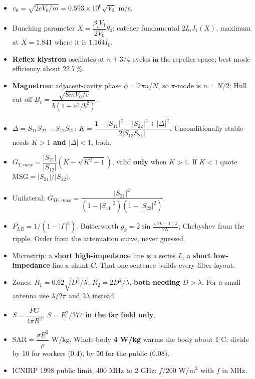 \begin{itemize}
  \item $v_0 = \sqrt{2eV_0/m} = 0.593\times10^6\sqrt{V_0}$ m/s.
  \item Bunching parameter $X = \dfrac{\beta_i V_1}{2V_0}\theta_0$; catcher fundamental
    $2I_0J_1(X)$, maximum at $X = \mathbf{1.841}$ where it is $1.164I_0$.
  \item \textbf{Reflex klystron} oscillates at $n + 3/4$ cycles in the repeller space;
    best mode efficiency about 22.7\,\%.
  \item \textbf{Magnetron}: adjacent-cavity phase $\phi = 2\pi n/N$, so $\pi$-mode is
    $n = N/2$; Hull cut-off $B_c = \dfrac{\sqrt{8mV_0/e}}{b(1-a^2/b^2)}$.
\end{itemize}

\begin{itemize}
  \item $\Delta = S_{11}S_{22} - S_{12}S_{21}$;
    $K = \dfrac{1-|S_{11}|^2-|S_{22}|^2+|\Delta|^2}{2|S_{12}S_{21}|}$. Unconditionally
    stable needs \textbf{$K>1$ and $|\Delta|<1$}, both.
  \item $G_{T,max} = \dfrac{|S_{21}|}{|S_{12}|}\left(K - \sqrt{K^2-1}\right)$, valid
    \textbf{only} when $K>1$. If $K<1$ quote $\mathrm{MSG} = |S_{21}|/|S_{12}|$.
  \item Unilateral: $G_{TU,max} = \dfrac{|S_{21}|^2}{(1-|S_{11}|^2)(1-|S_{22}|^2)}$.
  \item $P_{LR} = 1/(1-|\Gamma|^2)$. Butterworth $g_k = 2\sin\frac{(2k-1)\pi}{2N}$;
    Chebyshev from the ripple. Order from the attenuation curve, never guessed.
  \item Microstrip: a \textbf{short high-impedance} line is a series $L$, a \textbf{short
    low-impedance} line a shunt $C$. That one sentence builds every filter layout.
\end{itemize}

\begin{itemize}
  \item Zones: $R_1 = 0.62\sqrt{D^3/\lambda}$, $R_2 = 2D^2/\lambda$, \textbf{both needing
    $D > \lambda$}. For a small antenna use $\lambda/2\pi$ and $2\lambda$ instead.
  \item $S = \dfrac{P G}{4\pi R^2}$, $S = E^2/377$ \textbf{in the far field only}.
  \item $\mathrm{SAR} = \dfrac{\sigma E^2}{\rho}$ W/kg. Whole-body \textbf{4 W/kg} warms the
    body about $1^\circ$C: divide by 10 for workers (0.4), by 50 for the public (0.08).
  \item ICNIRP 1998 public limit, 400 MHz to 2 GHz: $f/200$ W/m$^2$ with $f$ in MHz.
\end{itemize}

